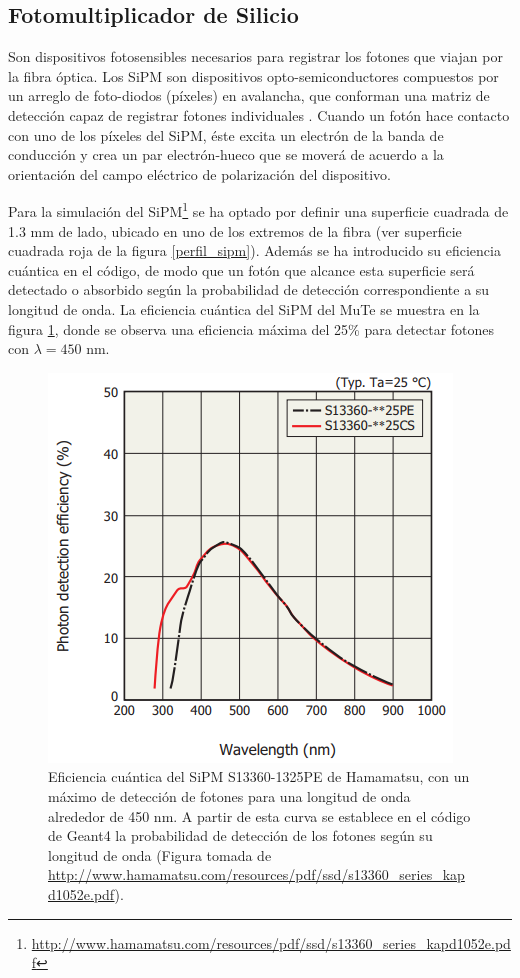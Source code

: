\documentclass[12pt,oneside,openany,letter]{book}
\begin{document}
\subsection{Fotomultiplicador de Silicio}
Son dispositivos fotosensibles necesarios para registrar los fotones que viajan por la fibra óptica. Los SiPM son dispositivos opto-semiconductores compuestos por un arreglo de foto-diodos (píxeles) en avalancha, que conforman una matriz de detección capaz de registrar fotones individuales \cite{HamamatsuSipmMeasu}. Cuando un fotón hace contacto con uno de los píxeles del SiPM, éste excita un electrón de la banda de conducción y crea un par electrón-hueco que se moverá de acuerdo a la orientación del campo eléctrico de polarización del dispositivo.

Para la simulación del SiPM\footnote{\url{http://www.hamamatsu.com/resources/pdf/ssd/s13360_series_kapd1052e.pdf}} se ha optado por definir una superficie cuadrada de 1.3 mm de lado, ubicado en uno de los extremos de la fibra (ver superficie cuadrada roja de la figura \ref{perfil_sipm}). Además se ha introducido su eficiencia cuántica en el código, de modo que un fotón que alcance esta superficie será detectado o absorbido según la probabilidad de detección correspondiente a su longitud de onda. La eficiencia cu\'antica del SiPM del MuTe se muestra en la figura \ref{QESIPM}, donde se observa una eficiencia máxima del 25\% para detectar fotones con $\lambda = 450$ nm.

\begin{figure}[h!]
    \centering
        \includegraphics[scale=0.7]{images/QESIPM.png}
   \caption[Eficiencia cuántica del SiPM S13360-1325PE de Hamamatsu]{Eficiencia cuántica del SiPM S13360-1325PE de Hamamatsu, con un máximo de detección de fotones para una longitud de onda alrededor de 450 nm. A partir de esta curva se establece en el c\'odigo de Geant4 la probabilidad de detecci\'on de los fotones seg\'un su longitud de onda (Figura tomada de \url{http://www.hamamatsu.com/resources/pdf/ssd/s13360_series_kapd1052e.pdf}).}\label{QESIPM}
\end{figure}
\end{document}
